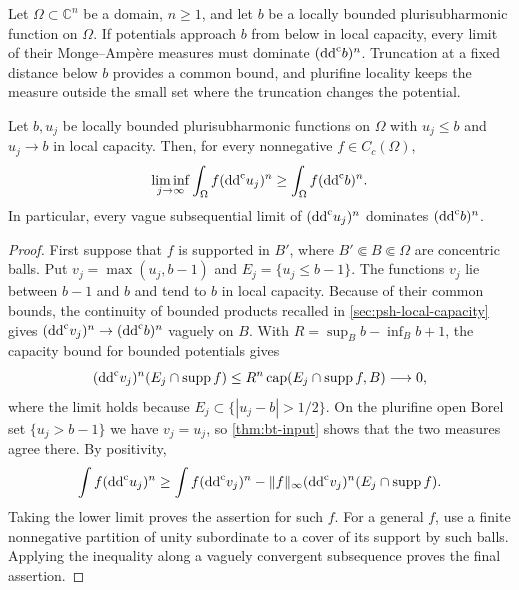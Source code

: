Let $\Omega\subset\mathbb C^n$ be a domain, $n\geq1$, and let $b$ be a locally bounded plurisubharmonic function on $\Omega$. If potentials approach $b$ from below in local capacity, every limit of their Monge--Amp\`ere measures must dominate $(\mathrm{dd}^{\mathrm{c}} b)^n$. Truncation at a fixed distance below $b$ provides a common bound, and plurifine locality keeps the measure outside the small set where the truncation changes the potential.

\begin{lemma}\label{lem:capacity-limit-measure-floor}
Let $b,u_j$ be locally bounded plurisubharmonic functions on $\Omega$ with $u_j\leq b$ and $u_j\to b$ in local capacity. Then, for every nonnegative $f\in C_c(\Omega)$,
\[
 \liminf_{j\to\infty}\int_\Omega f(\mathrm{dd}^{\mathrm{c}} u_j)^n
      \geq\int_\Omega f(\mathrm{dd}^{\mathrm{c}} b)^n.
\]
In particular, every vague subsequential limit of $(\mathrm{dd}^{\mathrm{c}} u_j)^n$ dominates $(\mathrm{dd}^{\mathrm{c}} b)^n$.
\end{lemma}
\begin{proof}
First suppose that $f$ is supported in $B'$, where $B'\Subset B\Subset\Omega$ are concentric balls. Put $v_j=\max(u_j,b-1)$ and $E_j=\{u_j\leq b-1\}$. The functions $v_j$ lie between $b-1$ and $b$ and tend to $b$ in local capacity. Because of their common bounds, the continuity of bounded products recalled in \cref{sec:psh-local-capacity} gives $(\mathrm{dd}^{\mathrm{c}} v_j)^n\to(\mathrm{dd}^{\mathrm{c}} b)^n$ vaguely on $B$. With $R=\sup_B b-\inf_B b+1$, the capacity bound for bounded potentials gives
\[
 (\mathrm{dd}^{\mathrm{c}} v_j)^n(E_j\cap\operatorname{supp}f)
 \leq R^n\operatorname{cap}(E_j\cap\operatorname{supp}f,B)
 \longrightarrow0,
\]
where the limit holds because $E_j\subset\{|u_j-b|>1/2\}$. On the plurifine open Borel set $\{u_j>b-1\}$ we have $v_j=u_j$, so \cref{thm:bt-input} shows that the two measures agree there. By positivity,
\[
 \int f(\mathrm{dd}^{\mathrm{c}} u_j)^n
 \geq\int f(\mathrm{dd}^{\mathrm{c}} v_j)^n
       -\|f\|_\infty(\mathrm{dd}^{\mathrm{c}} v_j)^n(E_j\cap\operatorname{supp}f).
\]
Taking the lower limit proves the assertion for such $f$. For a general $f$, use a finite nonnegative partition of unity subordinate to a cover of its support by such balls. Applying the inequality along a vaguely convergent subsequence proves the final assertion.
\end{proof}

